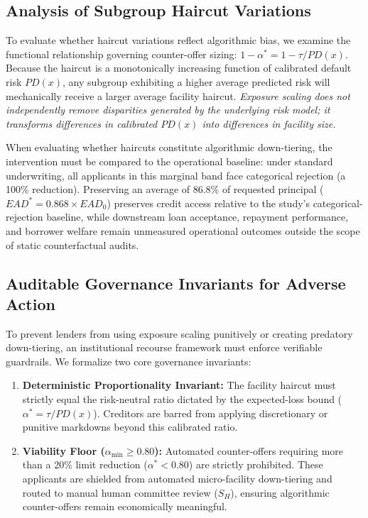 \documentclass[manuscript,screen,review,anonymous]{acmart}
\begin{document}
\subsection{Analysis of Subgroup Haircut Variations}
To evaluate whether haircut variations reflect algorithmic bias, we examine the functional relationship governing counter-offer sizing: $1 - \alpha^* = 1 - \tau / PD(x)$. Because the haircut is a monotonically increasing function of calibrated default risk $PD(x)$, any subgroup exhibiting a higher average predicted risk will mechanically receive a larger average facility haircut. \emph{Exposure scaling does not independently remove disparities generated by the underlying risk model; it transforms differences in calibrated $PD(x)$ into differences in facility size.} 

When evaluating whether haircuts constitute algorithmic down-tiering, the intervention must be compared to the operational baseline: under standard underwriting, all applicants in this marginal band face categorical rejection (a 100\% reduction). Preserving an average of 86.8\% of requested principal ($EAD^* = 0.868 \times EAD_0$) preserves credit access relative to the study's categorical-rejection baseline, while downstream loan acceptance, repayment performance, and borrower welfare remain unmeasured operational outcomes outside the scope of static counterfactual audits.

\subsection{Auditable Governance Invariants for Adverse Action}
To prevent lenders from using exposure scaling punitively or creating predatory down-tiering, an institutional recourse framework must enforce verifiable guardrails. We formalize two core governance invariants:
\begin{enumerate}
    \item \textbf{Deterministic Proportionality Invariant:} The facility haircut must strictly equal the risk-neutral ratio dictated by the expected-loss bound ($\alpha^* = \tau / PD(x)$). Creditors are barred from applying discretionary or punitive markdowns beyond this calibrated ratio.
    \item \textbf{Viability Floor ($\alpha_{\min} \ge 0.80$):} Automated counter-offers requiring more than a 20\% limit reduction ($\alpha^* < 0.80$) are strictly prohibited. These applicants are shielded from automated micro-facility down-tiering and routed to manual human committee review ($S_H$), ensuring algorithmic counter-offers remain economically meaningful.
\end{enumerate}
\end{document}
